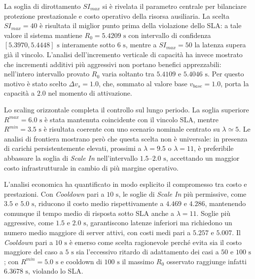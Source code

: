 ﻿\documentclass[a4paper,12pt]{article}
\begin{document}
La soglia di dirottamento $SI_{max}$ si è rivelata il parametro centrale per bilanciare protezione prestazionale e costo operativo della risorsa ausiliaria. La scelta $SI_{max}=40$ è risultata il miglior punto prima della violazione dello SLA: a tale valore il sistema mantiene $R_0=5.4209\text{ s}$ con intervallo di confidenza $[5.3970,5.4448]\text{ s}$ interamente sotto $6\text{ s}$, mentre a $SI_{max}=50$ la latenza supera già il vincolo. L'analisi dell'incremento verticale di capacità ha invece mostrato che incrementi additivi più aggressivi non portano benefici apprezzabili: nell'intero intervallo provato $R_0$ varia soltanto tra $5.4109$ e $5.4046\text{ s}$. Per questo motivo è stato scelto $\Delta v_s=1.0$, che, sommato al valore base $v_{base}=1.0$, porta la capacità a $2.0$ nel momento di attivazione.

Lo scaling orizzontale completa il controllo sul lungo periodo. La soglia superiore $R^{max}=6.0\text{ s}$ è stata mantenuta coincidente con il vincolo SLA, mentre $R^{min}=3.5\text{ s}$ è risultata coerente con uno scenario nominale centrato su $\lambda\simeq 5$. Le analisi di frontiera mostrano però che questa scelta non è universale: in presenza di carichi persistentemente elevati, prossimi a $\lambda=9.5$ o $\lambda=11$, è preferibile abbassare la soglia di \textit{Scale In} nell'intervallo $1.5$--$2.0\text{ s}$, accettando un maggior costo infrastrutturale in cambio di più margine operativo.

L'analisi economica ha quantificato in modo esplicito il compromesso tra costo e prestazioni. Con \textit{Cooldown} pari a $10\text{ s}$, le soglie di \textit{Scale In} più permissive, come $3.5$ e $5.0\text{ s}$, riducono il costo medio rispettivamente a $4.469$ e $4.286$, mantenendo comunque il tempo medio di risposta sotto SLA anche a $\lambda=11$. Soglie più aggressive, come $1.5$ e $2.0\text{ s}$, garantiscono latenze inferiori ma richiedono un numero medio maggiore di server attivi, con costi medi pari a $5.257$ e $5.007$. Il \textit{Cooldown} pari a $10\text{ s}$ è emerso come scelta ragionevole perché evita sia il costo maggiore del caso a $5\text{ s}$ sia l'eccessivo ritardo di adattamento dei casi a $50$ e $100\text{ s}$; con $R^{min}=5.0\text{ s}$ e cooldown di $100\text{ s}$ il massimo $R_0$ osservato raggiunge infatti $6.3678\text{ s}$, violando lo SLA.
\end{document}
